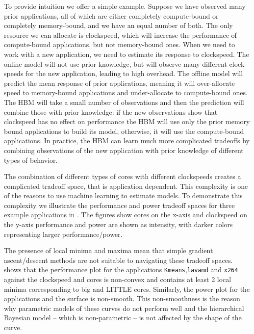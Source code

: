 To provide intuition we offer a simple example.  Suppose we have
observed many prior applications, all of which are either completely
compute-bound or completely memory-bound, and we have an equal number
of both.  The only resource we can allocate is clockspeed, which will
increase the performance of compute-bound applications, but not
memory-bound ones.  When we need to work with a new application, we
need to estimate its response to clockspeed.  The online model will
not use prior knowledge, but will observe many different clock speeds
for the new application, leading to high overhead.  The offline model
will predict the mean response of prior applications, meaning it will
over-allocate speed to memory-bound applications and under-allocate to
compute-bound ones.  The HBM will take a small number of observations
and then the prediction will combine those with prior knowledge: if
the new observations show that clockspeed has no effect on performance
the HBM will use only the prior memory bound applications to build its
model, otherwise, it will use the compute-bound applications.  In
practice, the HBM can learn much more complicated tradeoffs by
combining observations of the new application with prior knowledge of
different types of behavior.

The combination of different types of cores with different clockspeeds
creates a complicated tradeoff space, that is application dependent.
This complexity is one of the reasons to use machine learning to
estimate models.  To demonstrate this complexity we illustrate the
performance and power tradeoff spaces for three example applications
in .  The figures show cores on the x-axis and
clockspeed on the y-axis performance and power are shown as intensity,
with darker colors representing larger performance/power.

The presence of local minima and maxima mean that simple gradient
ascent/descent methods are not suitable to navigating these tradeoff
spaces.  shows that the performance plot for the
applications \texttt{Kmeans},\texttt{lavamd} and \texttt{x264} against
the clockspeed and cores is non-convex and contains at least 2 local
minima corresponding to big and LITTLE cores.  Similarly, the power
plot for the applications and the surface is non-smooth.  This
non-smoothness is the reason why parametric models of these curves do
not perform well and the hierarchical Bayesian model -- which is
non-parametric -- is not affected by the shape of the curve.

